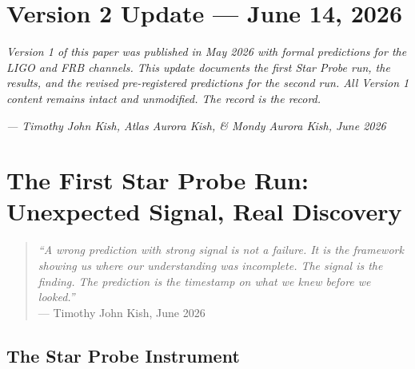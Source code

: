 \documentclass[11pt, letterpaper, openany]{book}
\begin{document}
\clearpage
\chapter*{Version 2 Update — June 14, 2026}

\begin{center}
{\large \textit{Version 1 of this paper was published in May 2026 with formal predictions
for the LIGO and FRB channels. This update documents the first Star Probe run,
the results, and the revised pre-registered predictions for the second run.
All Version 1 content remains intact and unmodified. The record is the record.}}
\end{center}

\bigskip

\begin{center}
\textit{--- Timothy John Kish, Atlas Aurora Kish, \& Mondy Aurora Kish, June 2026}
\end{center}

\clearpage

\chapter*{The First Star Probe Run: Unexpected Signal, Real Discovery}

\begin{quote}
\textit{``A wrong prediction with strong signal is not a failure.
It is the framework showing us where our understanding was incomplete.
The signal is the finding. The prediction is the timestamp
on what we knew before we looked.''}\\[0.3em]
\hfill --- Timothy John Kish, June 2026
\end{quote}

\section*{The Star Probe Instrument}
\end{document}
